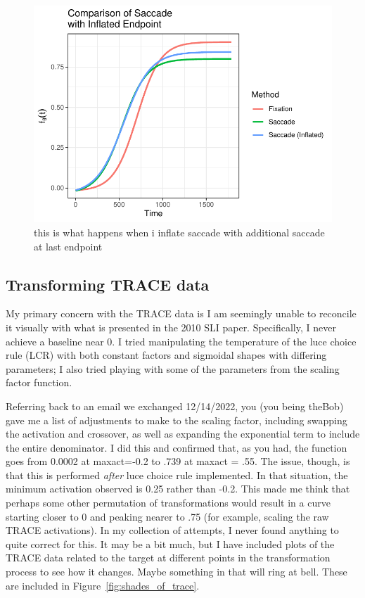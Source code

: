\documentclass{article}
\begin{document}
\begin{figure}
\centering
\includegraphics{sac_inflate_compare.pdf}
\caption{this is what happens when i inflate saccade with additional saccade at last endpoint}
\label{fig:saccade_inflate}
\end{figure}

\subsection{Transforming TRACE data}


My primary concern with the TRACE data is I am seemingly unable to reconcile it visually with what is presented in the 2010 SLI paper. Specifically, I never achieve a baseline near 0. I tried manipulating the temperature of the luce choice rule (LCR) with both constant factors and sigmoidal shapes with differing parameters; I also tried playing with some of the parameters from the scaling factor function.


Referring back to an email we exchanged 12/14/2022, you (you being theBob) gave me a list of adjustments to make to the scaling factor, including swapping the activation and crossover, as well as expanding the exponential term to include the entire denominator. I did this and confirmed that, as you had, the function goes from 0.0002 at maxact=-0.2 to .739 at maxact = .55. The issue, though, is that this is performed \textit{after} luce choice rule implemented. In that situation, the minimum activation observed is 0.25 rather than -0.2. This made me think that perhaps some other permutation of transformations would result in a curve starting closer to 0 and peaking nearer to .75 (for example, scaling the raw TRACE activations). In my collection of attempts, I never found anything to quite correct for this. It may be a bit much, but I have included plots of the TRACE data related to the target at different points in the transformation process to see how it changes. Maybe something in that will ring at bell. These are included in  Figure~\ref{fig:shades_of_trace}. 
\end{document}
